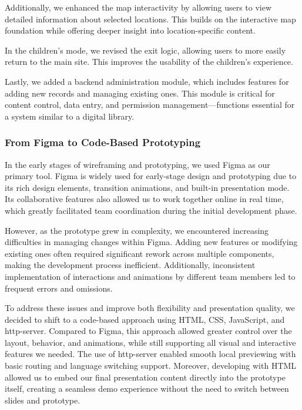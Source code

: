 Additionally, we enhanced the map interactivity by allowing users to view detailed information about selected locations. This builds on the interactive map foundation while offering deeper insight into location-specific content.

In the children’s mode, we revised the exit logic, allowing users to more easily return to the main site. This improves the usability of the children’s experience.

Lastly, we added a backend administration module, which includes features for adding new records and managing existing ones. This module is critical for content control, data entry, and permission management—functions essential for a system similar to a digital library.

\subsubsection{From Figma to Code-Based Prototyping}

In the early stages of wireframing and prototyping, we used Figma as our primary tool. Figma is widely used for early-stage design and prototyping due to its rich design elements, transition animations, and built-in presentation mode. Its collaborative features also allowed us to work together online in real time, which greatly facilitated team coordination during the initial development phase.

However, as the prototype grew in complexity, we encountered increasing difficulties in managing changes within Figma. Adding new features or modifying existing ones often required significant rework across multiple components, making the development process inefficient. Additionally, inconsistent implementation of interactions and animations by different team members led to frequent errors and omissions.

To address these issues and improve both flexibility and presentation quality, we decided to shift to a code-based approach using HTML, CSS, JavaScript, and http-server. Compared to Figma, this approach allowed greater control over the layout, behavior, and animations, while still supporting all visual and interactive features we needed. The use of http-server enabled smooth local previewing with basic routing and language switching support. Moreover, developing with HTML allowed us to embed our final presentation content directly into the prototype itself, creating a seamless demo experience without the need to switch between slides and prototype.

